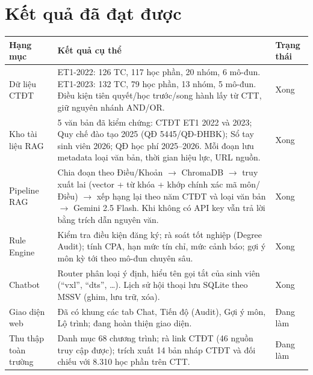 \documentclass[11pt,a4paper]{article}
\newcommand{\xong}{Xong}
\newcommand{\dang}{Đang làm}
\begin{document}
\section{Kết quả đã đạt được}

\begin{tabularx}{\linewidth}{@{}>{\raggedright\arraybackslash}p{3.1cm}X>{\centering\arraybackslash}p{1.6cm}@{}}
\toprule
\textbf{Hạng mục} & \textbf{Kết quả cụ thể} & \textbf{Trạng thái} \\
\midrule
Dữ liệu CTĐT &
  ET1-2022: 126 TC, 117 học phần, 20 nhóm, 6 mô-đun.
  ET1-2023: 132 TC, 79 học phần, 13 nhóm, 5 mô-đun.
  Điều kiện tiên quyết/học trước/song hành lấy từ CTT, giữ nguyên nhánh AND/OR. & \xong \\
Kho tài liệu RAG &
  5 văn bản đã kiểm chứng: CTĐT ET1 2022 và 2023; Quy chế đào tạo 2025
  (QĐ 5445/QĐ-ĐHBK); Sổ tay sinh viên 2026; QĐ học phí 2025--2026.
  Mỗi đoạn lưu metadata loại văn bản, thời gian hiệu lực, URL nguồn. & \xong \\
Pipeline RAG &
  Chia đoạn theo Điều/Khoản $\rightarrow$ ChromaDB $\rightarrow$ truy xuất lai
  (vector + từ khóa + khớp chính xác mã môn/Điều) $\rightarrow$ xếp hạng lại theo
  năm CTĐT và loại văn bản $\rightarrow$ Gemini 2.5 Flash. Khi không có API key
  vẫn trả lời bằng trích dẫn nguyên văn. & \xong \\
Rule Engine &
  Kiểm tra điều kiện đăng ký; rà soát tốt nghiệp (Degree Audit); tính CPA,
  hạn mức tín chỉ, mức cảnh báo; gợi ý môn kỳ tới theo mô-đun chuyên sâu. & \xong \\
Chatbot &
  Router phân loại ý định, hiểu tên gọi tắt của sinh viên (``vxl'', ``dts'', \dots).
  Lịch sử hội thoại lưu SQLite theo MSSV (ghim, lưu trữ, xóa). & \xong \\
Giao diện web &
  Đã có khung các tab Chat, Tiến độ (Audit), Gợi ý môn, Lộ trình; đang hoàn thiện giao diện. & \dang \\
Thu thập toàn trường &
  Danh mục 68 chương trình; rà link CTĐT (46 nguồn truy cập được); trích xuất
  14 bản nháp CTĐT và đối chiếu với 8.310 học phần trên CTT. & \dang \\
\bottomrule
\end{tabularx}
\end{document}

